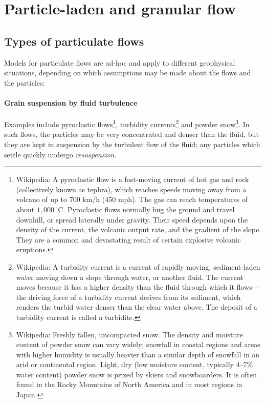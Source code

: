 \newpage
\section{Particle-laden and granular flow} \label{section-nmv}

\subsection{Types of particulate flows}

Models for particulate flows are ad-hoc and apply to different geophysical situations, depending on which assumptions may be made about the flows and the particles:

\paragraph{Grain suspension by fluid turbulence} Examples include pyroclastic
flows\footnote{Wikipedia: A pyroclastic flow is a fast-moving current of hot gas and
rock (collectively known as tephra), which reaches speeds moving away from a
volcano of up to 700 km/h (450 mph). The gas can reach temperatures of about
$1,000\,^{\circ}\mathrm{C}$. Pyroclastic flows normally hug the ground and travel downhill, or
spread laterally under gravity. Their speed depends upon the density of the
current, the volcanic output rate, and the gradient of the slope. They are a
common and devastating result of certain explosive volcanic eruptions.}, turbidity currents\footnote{Wikipedia: A turbidity current is a current of rapidly moving,
sediment-laden water moving down a slope through water, or another fluid. The
current moves because it has a higher density than the fluid through which it
flows—the driving force of a turbidity current derives from its sediment, which
renders the turbid water denser than the clear water above. The deposit of a
turbidity current is called a turbidite.} and powder snow\footnote{Wikipedia: Freshly fallen, uncompacted snow. The density and moisture
content of powder snow can vary widely; snowfall in coastal regions and areas
with higher humidity is usually heavier than a similar depth of snowfall in an
arid or continental region. Light, dry (low moisture content, typically 4–7\%
water content) powder snow is prized by skiers and snowboarders. It is often
found in the Rocky Mountains of North America and in most regions in Japan.}. In such flows, the particles may be very concentrated and denser than the fluid, but
they are kept in suspension by the turbulent flow of the fluid; any particles
which settle quickly undergo \textit{resuspension}.

